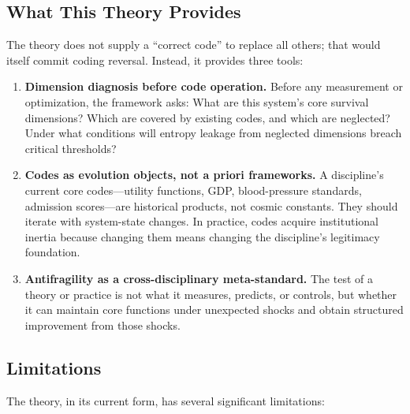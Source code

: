 \documentclass[11pt,a4paper]{article}
\begin{document}
\subsection{What This Theory Provides}

The theory does not supply a ``correct code'' to replace all others; that would itself commit coding reversal. Instead, it provides three tools:

\begin{enumerate}
    \item \textbf{Dimension diagnosis before code operation.} Before any measurement or optimization, the framework asks: What are this system's core survival dimensions? Which are covered by existing codes, and which are neglected? Under what conditions will entropy leakage from neglected dimensions breach critical thresholds?

    \item \textbf{Codes as evolution objects, not a priori frameworks.} A discipline's current core codes---utility functions, GDP, blood-pressure standards, admission scores---are historical products, not cosmic constants. They should iterate with system-state changes. In practice, codes acquire institutional inertia because changing them means changing the discipline's legitimacy foundation.

    \item \textbf{Antifragility as a cross-disciplinary meta-standard.} The test of a theory or practice is not what it measures, predicts, or controls, but whether it can maintain core functions under unexpected shocks and obtain structured improvement from those shocks.
\end{enumerate}

\subsection{Limitations}

The theory, in its current form, has several significant limitations:
\end{document}
